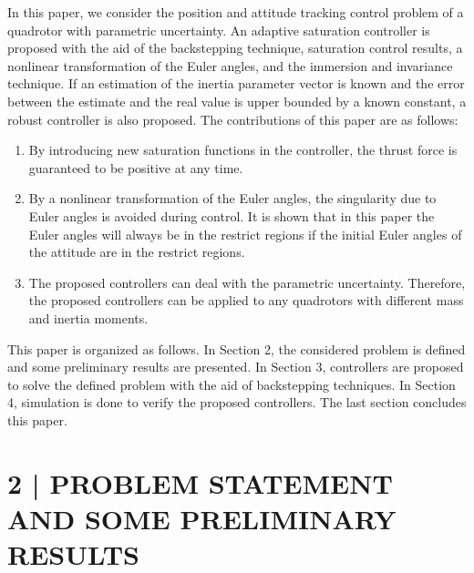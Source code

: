 \documentclass[10pt]{article}
\begin{document}
In this paper, we consider the position and attitude tracking control problem of a quadrotor with parametric uncertainty. An adaptive saturation controller is proposed with the aid of the backstepping technique, saturation control results, a nonlinear transformation of the Euler angles, and the immersion and invariance technique. If an estimation of the inertia parameter vector is known and the error between the estimate and the real value is upper bounded by a known constant, a robust controller is also proposed. The contributions of this paper are as follows:

\begin{enumerate}
  \item By introducing new saturation functions in the controller, the thrust force is guaranteed to be positive at any time.

  \item By a nonlinear transformation of the Euler angles, the singularity due to Euler angles is avoided during control. It is shown that in this paper the Euler angles will always be in the restrict regions if the initial Euler angles of the attitude are in the restrict regions.

  \item The proposed controllers can deal with the parametric uncertainty. Therefore, the proposed controllers can be applied to any quadrotors with different mass and inertia moments.

\end{enumerate}

This paper is organized as follows. In Section 2, the considered problem is defined and some preliminary results are presented. In Section 3, controllers are proposed to solve the defined problem with the aid of backstepping techniques. In Section 4, simulation is done to verify the proposed controllers. The last section concludes this paper.

\section{2 | PROBLEM STATEMENT AND SOME PRELIMINARY RESULTS}
\end{document}
